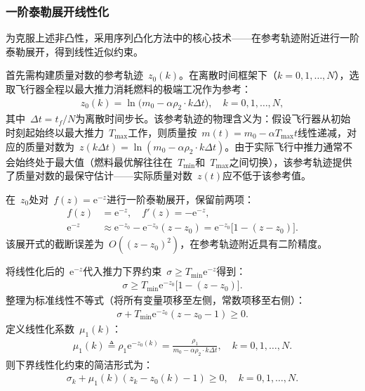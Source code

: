 \subsubsection{一阶泰勒展开线性化}

为克服上述非凸性，采用序列凸化方法中的核心技术——在参考轨迹附近进行一阶泰勒展开，得到线性近似约束。

首先需构建质量对数的参考轨迹~$z_0(k)$。在离散时间框架下（$k=0,1,\dots,N$），选取飞行器全程以最大推力消耗燃料的极端工况作为参考：
\begin{align}
z_0(k) = \ln\bigl(m_0 - \alpha\rho_2\cdot k\Delta t\bigr),\quad k=0,1,\dots,N,
\end{align}
其中~$\Delta t = t_f/N$为离散时间步长。该参考轨迹的物理含义为：假设飞行器从初始时刻起始终以最大推力~$T_{\max}$工作，则质量按~$m(t)=m_0-\alpha T_{\max}t$线性递减，对应的质量对数为~$z(k\Delta t)=\ln(m_0-\alpha \rho_2\cdot k\Delta t)$。由于实际飞行中推力通常不会始终处于最大值（燃料最优解往往在~$T_{\min}$和~$T_{\max}$之间切换），该参考轨迹提供了质量对数的最保守估计——实际质量对数~$z(t)$应不低于该参考值。

在~$z_0$处对~$f(z)=\mathrm{e}^{-z}$进行一阶泰勒展开，保留前两项：
\begin{align}
f(z) &= \mathrm{e}^{-z},\quad f'(z) = -\mathrm{e}^{-z},\\
\mathrm{e}^{-z} &\approx \mathrm{e}^{-z_0} - \mathrm{e}^{-z_0}(z-z_0) = \mathrm{e}^{-z_0}\bigl[1-(z-z_0)\bigr].
\end{align}
该展开式的截断误差为~$O((z-z_0)^2)$，在参考轨迹附近具有二阶精度。

将线性化后的~$\mathrm{e}^{-z}$代入推力下界约束~$\sigma\ge T_{\min}\mathrm{e}^{-z}$得到：
\begin{align}
\sigma \ge T_{\min}\mathrm{e}^{-z_0}\bigl[1-(z-z_0)\bigr].
\end{align}
整理为标准线性不等式（将所有变量项移至左侧，常数项移至右侧）：
\begin{align}
\sigma + T_{\min}\mathrm{e}^{-z_0}(z - z_0 - 1) \ge 0.
\end{align}
定义线性化系数~$\mu_1(k)$：
\begin{align}
\mu_1(k) \triangleq \rho_1\mathrm{e}^{-z_0(k)} = \frac{\rho_1}{m_0 - \alpha \rho_2\cdot k\Delta t},\quad k=0,1,\dots,N.
\end{align}
则下界线性化约束的简洁形式为：
\begin{align}
\sigma_k + \mu_1(k)(z_k - z_0(k) - 1) \ge 0,\quad k=0,1,\dots,N.\label{eq:lower_linear}
\end{align}

